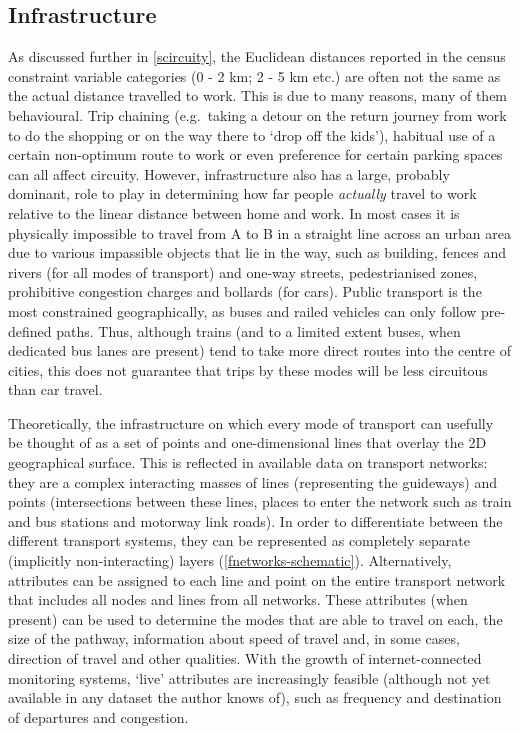 \subsection{Infrastructure}
As discussed further in \cref{scircuity}, the Euclidean distances reported in
the census constraint variable categories (0 - 2 km; 2 - 5 km etc.) are often
not the same as the actual distance travelled to work. This is due to many
reasons, many of them behavioural.
Trip chaining (e.g.~taking a detour on the return journey from
work to do the shopping or on the way there to `drop off the kids'), habitual
use of a certain non-optimum route to work or even preference for
certain parking spaces can all affect circuity. However, infrastructure also
has a large, probably dominant, role to play in determining
how far people \emph{actually} travel to
work relative to the linear distance between home and work. In most cases it is
physically
impossible to travel from A to B in a straight line across an urban area due to
various impassible objects that lie in the way, such as building, fences and
rivers (for all modes of transport) and one-way streets, pedestrianised zones,
prohibitive congestion charges and bollards (for cars). Public transport is the
most constrained geographically, as buses and railed vehicles can only follow
pre-defined paths. Thus, although trains (and to a limited extent buses, when
dedicated bus lanes are present) tend to take more direct routes into the
centre of cities, this does not guarantee that trips by these modes will be
less circuitous than car travel.

Theoretically, the infrastructure on which every mode of transport can usefully
be thought of as a set of points and one-dimensional lines that overlay the
2D geographical surface. %
This is reflected in available data on transport
networks: they are
a complex interacting masses of lines (representing the guideways) and points
(intersections between these lines, places to enter the network such as
train and bus stations and motorway link roads). In order to differentiate
between the different transport systems, they can be represented as
completely separate (implicitly non-interacting) layers
(\cref{fnetworks-schematic}). Alternatively,
attributes can be assigned to each
line and point on the entire transport network that includes all nodes and
lines from all networks. These attributes (when present) can be used to
determine the modes that
are able to travel on each, the size of the pathway, information about speed
of travel and, in some cases, direction of travel and other qualities.
With the growth of internet-connected monitoring systems, %
`live' attributes are increasingly feasible (although not yet available in any
dataset the author knows of), such as frequency and destination of departures
and congestion.

